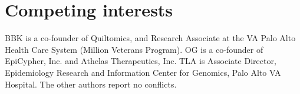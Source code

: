 \documentclass[letter]{bioinfo}
\begin{document}
	\section*{Competing interests}
	
	BBK is a co-founder of Quiltomics, and Research Associate at the VA Palo Alto Health Care System (Million Veterans Program).  OG is a co-founder of EpiCypher, Inc. and Athelas Therapeutics, Inc.  TLA is Associate Director, Epidemiology Research and Information 
    Center for Genomics, Palo Alto VA Hospital.  The other authors report no conflicts.\vspace*{-12pt} 
	
	
	
	
	
	
\end{document}
